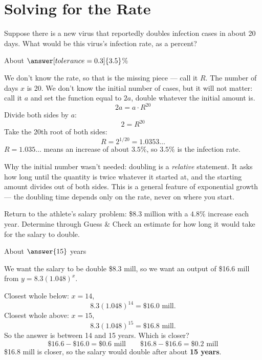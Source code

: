 \documentclass[12pt]{ximera}
\begin{document}
\section*{Solving for the Rate}

\begin{problem}
Suppose there is a new virus that reportedly doubles infection cases in about 20 days.
What would be this virus's infection rate, as a percent?

About $\answer[tolerance=0.3]{3.5}$\%

\begin{freeResponse}
\end{freeResponse}

\begin{solution}
We don't know the rate, so that is the missing piece --- call it $R$. The number of days
$x$ is 20. We don't know the initial number of cases, but it will not matter: call it $a$
and set the function equal to $2a$, double whatever the initial amount is.
\[
2a = a \cdot R^{20}
\]
Divide both sides by $a$:
\[
2 = R^{20}
\]
Take the 20th root of both sides:
\[
R = 2^{1/20} = 1.0353\ldots
\]
$R = 1.035\ldots$ means an increase of about $3.5\%$, so $3.5\%$ is the infection rate.

Why the initial number wasn't needed: doubling is a \emph{relative} statement. It asks
how long until the quantity is twice whatever it started at, and the starting amount
divides out of both sides. This is a general feature of exponential growth --- the
doubling time depends only on the rate, never on where you start.
\end{solution}
\end{problem}

\begin{problem}
Return to the athlete's salary problem: \$8.3 million with a $4.8\%$ increase each year.
Determine through Guess \& Check an estimate for how long it would take for the salary to
double.

About $\answer{15}$ years

\begin{freeResponse}
\end{freeResponse}

\begin{solution}
We want the salary to be double \$8.3 mill, so we want an output of \$16.6 mill from
$y = 8.3(1.048)^x$.

Closest whole below: $x = 14$,
\[
8.3(1.048)^{14} = \$16.0 \text{ mill}.
\]
Closest whole above: $x = 15$,
\[
8.3(1.048)^{15} = \$16.8 \text{ mill}.
\]
So the answer is between 14 and 15 years. Which is closer?
\[
\$16.6 - \$16.0 = \$0.6 \text{ mill}
\qquad
\$16.8 - \$16.6 = \$0.2 \text{ mill}
\]
\$16.8 mill is closer, so the salary would double after about \textbf{15 years}.
\end{solution}
\end{problem}
\end{document}
